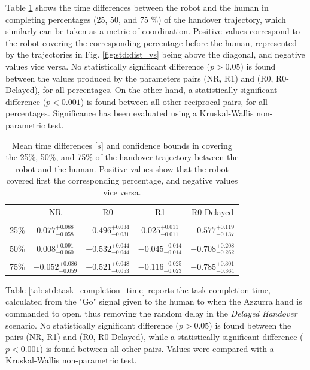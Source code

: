 \documentclass[lettersize,journal]{IEEEtran}
\begin{document}
Table \ref{tab:std:coordination_delay} shows the time differences between the robot and the human in completing percentages (25, 50, and 75 \%) of the handover trajectory, which similarly can be taken as a metric of coordination.
Positive values correspond to the robot covering the corresponding percentage before the human, represented by the trajectories in Fig. \ref{fig:std:dist_vs} being above the diagonal, and negative values vice versa.
No statistically significant difference ($p>0.05$) is found between the values produced by the parameters pairs (NR, R1) and (R0, R0-Delayed), for all percentages.
On the other hand, a statistically significant difference ($p<0.001$) is found between all other reciprocal pairs, for all percentages.
Significance has been evaluated using a Kruskal-Wallis non-parametric test.

\begin{table}[h!]
\scriptsize
    \begin{center}
        \begin{tabular}{l|cccc}
        & NR & R0 & R1 & R0-Delayed \\
        &&&&\\
        
        25\% & $ 0.077_{-0.058}^{+0.088}$ & $-0.496_{-0.031}^{+0.034}$ & $ 0.025_{-0.011}^{+0.011}$ & $-0.577_{-0.137}^{+0.119}$ \\
        &&&&\\
        
        50\% & $ 0.008_{-0.060}^{+0.091}$ & $-0.532_{-0.044}^{+0.044}$ & $-0.045_{-0.014}^{+0.014}$ & $-0.708_{-0.262}^{+0.208}$ \\
        &&&&\\
        
        75\% & $-0.052_{-0.059}^{+0.086}$ & $-0.521_{-0.053}^{+0.048}$ & $-0.116_{-0.023}^{+0.025}$ & $-0.785_{-0.364}^{+0.301}$ \\

     
        \end{tabular}
    \end{center}
    \caption{Mean time differences [$s$] and confidence bounds in covering the 25\%, 50\%, and 75\% of the handover trajectory between the robot and the human. Positive values show that the robot covered first the corresponding percentage, and negative values vice versa.}
    \label{tab:std:coordination_delay}
\end{table}


Table \ref{tab:std:task_completion_time} reports the task completion time, calculated from the "Go" signal given to the human to when the Azzurra hand is commanded to open, thus removing the random delay in the \textit{Delayed Handover} scenario.
No statistically significant difference ($p>0.05$) is found between the pairs (NR, R1) and (R0, R0-Delayed), while a statistically significant difference ($p<0.001$) is found between all other pairs. Values were compared with a Kruskal-Wallis non-parametric test.
\end{document}

